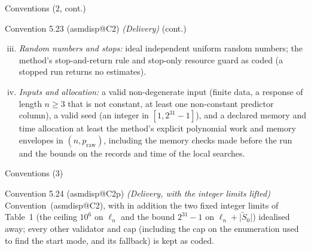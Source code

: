 \documentclass[aspectratio=169]{beamer}
\makeatletter
\newcommand{\asmdisp}[1]{\csname asmdisp@#1\endcsname}
\newcommand{\as}[1]{\textup{(\asmdisp{#1})}}
\newcommand{\abs}[1]{\lvert #1\rvert}
\newcommand{\praw}{p_{\mathrm{raw}}}
\newcommand{\tSz}{\tilde S_0}
\makeatother
\begin{document}
\begin{frame}{Conventions (2, cont.)}
\small
\begin{block}{Convention 5.23 (\asmdisp{C2}) \textit{(Delivery)} (cont.)}
\begin{enumerate}[(i)]\setcounter{enumi}{2}
  \item \emph{Random numbers and stops:} ideal independent uniform random numbers; the method's stop-and-return rule and
    stop-only resource guard as coded (a stopped run returns no estimates).
  \item \emph{Inputs and allocation:} a valid non-degenerate input (finite data, a response of length $n\ge3$ that is not
    constant, at least one non-constant predictor column), a valid seed (an integer in $[1,2^{31}-1]$), and a declared memory and time
    allocation at least the method's explicit polynomial work and memory envelopes in $(n,\praw)$, including the memory
    checks made before the run and the bounds on the records and time of the local searches.
\end{enumerate}
\end{block}
\end{frame}

\begin{frame}{Conventions (3)}
\small
\begin{block}{Convention 5.24 (\asmdisp{C2p}) \textit{(Delivery, with the integer limits lifted)}}
Convention~\as{C2}, with in addition the two fixed integer limits of Table~1 (the ceiling $10^6$ on $\ell_n$
and the bound $2^{31}-1$ on $\ell_n+\abs{\tSz}$) idealised away; every other validator and cap (including the cap on the
enumeration used to find the start mode, and its fallback) is kept as coded.
\end{block}
\end{frame}
\end{document}
